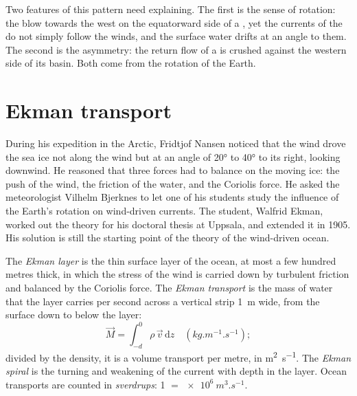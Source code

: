Two features of this pattern need explaining. The first is the sense of rotation:
the  blow towards the west on the equatorward side of a ,
yet the currents of the  do not simply follow the winds, and the surface water
drifts at an angle to them. The second is the asymmetry: the return flow of a 
is crushed against the western side of its basin. Both come from the rotation of
the Earth.

\section{Ekman transport}\label{sec:b1:ocean-circulation:ekman}

\begin{history}
During his expedition in the Arctic, Fridtjof Nansen noticed that the wind drove
the sea ice not along the wind but at an angle of \ang{20} to \ang{40} to its
right, looking downwind. He reasoned that three forces had to balance on the moving
ice: the push of the wind, the friction of the water, and the Coriolis force. He
asked the meteorologist Vilhelm Bjerknes to let one of his students study the
influence of the Earth's rotation on wind-driven currents. The student, Walfrid
Ekman, worked out the theory for his doctoral thesis at Uppsala, and extended it in
1905. His solution is still the starting point of the theory of the wind-driven
ocean.
\end{history}

\begin{definition}\label{def:b1:ocean-circulation:ekman}
The \emph{Ekman layer} is the thin surface layer of the ocean,
at most a few hundred metres thick, in which the stress of the wind is carried down
by turbulent friction and balanced by the Coriolis force. The \emph{Ekman
transport} is the mass of water that the layer carries per
second across a vertical strip \qty{1}{m} wide, from the surface down to below the
layer:
\[
  \vec M = \int_{-d}^{0} \rho\,\vec v\,\mathrm dz \quad (\unit{kg.m^{-1}.s^{-1}});
\]
divided by the density, it is a volume transport per metre, in
\unit{m^2.s^{-1}}. The \emph{Ekman spiral} is the turning and
weakening of the current with depth in the layer. Ocean transports are counted in
\emph{sverdrups}: \qty{1}{\sverdrup} $=
\qty{e6}{m^3.s^{-1}}$.
\end{definition}

